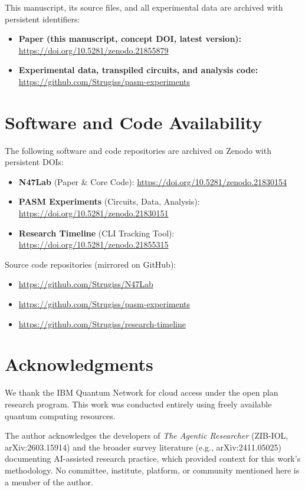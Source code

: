 \documentclass[12pt,a4paper]{article}
\begin{document}
This manuscript, its source files, and all experimental data are archived with persistent identifiers:
\begin{itemize}
    \item \textbf{Paper (this manuscript, concept DOI, latest version):} \url{https://doi.org/10.5281/zenodo.21855879}
    \item \textbf{Experimental data, transpiled circuits, and analysis code:} \url{https://github.com/Strugiss/pasm-experiments}
\end{itemize}

\section*{Software and Code Availability}

The following software and code repositories are archived on Zenodo with persistent DOIs:

\begin{itemize}
    \item \textbf{N47Lab} (Paper \& Core Code): \url{https://doi.org/10.5281/zenodo.21830154}
    \item \textbf{PASM Experiments} (Circuits, Data, Analysis): \url{https://doi.org/10.5281/zenodo.21830151}
    \item \textbf{Research Timeline} (CLI Tracking Tool): \url{https://doi.org/10.5281/zenodo.21855315}
\end{itemize}

Source code repositories (mirrored on GitHub):
\begin{itemize}
    \item \url{https://github.com/Strugiss/N47Lab}
    \item \url{https://github.com/Strugiss/pasm-experiments}
    \item \url{https://github.com/Strugiss/research-timeline}
\end{itemize}

\section*{Acknowledgments}

We thank the IBM Quantum Network for cloud access under the open plan research program. This work was conducted entirely using freely available quantum computing resources.

The author acknowledges the developers of \textit{The Agentic Researcher} (ZIB-IOL, arXiv:2603.15914) and the broader survey literature (e.g., arXiv:2411.05025) documenting AI-assisted research practice, which provided context for this work's methodology. No committee, institute, platform, or community mentioned here is a member of the author.
\end{document}
